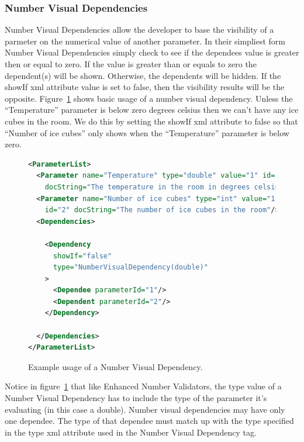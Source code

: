 \subsubsection{Number Visual Dependencies}
Number Visual Dependencies allow the developer to base the visibility of a parmeter on the numerical value of another parameter. In their simpliest form
Number Visual Dependencies simply check to see if the dependees value is greater then or equal to zero. If the value is greater than or equals to zero the
dependent(s) will be shown. Otherwise, the dependents will be hidden. If the showIf xml attribute value is set to false, then the visibility results will
be the opposite. Figure~\ref{NumberVisXML1} shows basic usage of a number visual dependency. Unless the ``Temperature'' parameter is below zero degrees
celsius then we can't have any ice cubes in the room. We do this by setting the showIf xml attribute to false so that ``Number of ice cubes'' only shows
when the ``Temperature'' parameter is below zero.
\begin{figure}
\centering
\begin{lstlisting}[language=XML]
<ParameterList>
  <Parameter name="Temperature" type="double" value="1" id="1" 
    docString="The temperature in the room in degrees celsius"/>
  <Parameter name="Number of ice cubes" type="int" value="1"
    id="2" docString="The number of ice cubes in the room"/>
  <Dependencies>

    <Dependency 
      showIf="false" 
      type="NumberVisualDependency(double)"
    >
      <Dependee parameterId="1"/>
      <Dependent parameterId="2"/>
    </Dependency>

  </Dependencies>
</ParameterList>
  \end{lstlisting}
  \caption{Example usage of a Number Visual Dependency.}
  \label{NumberVisXML1}
\end{figure}
Notice in figure~\ref{NumberVisXML1} that like Enhanced Number Validators, the type value of a Number Visual Dependency has to include the type of the
parameter it's evaluating (in this case a double). Number visual dependencies may have only one dependee. The type of that dependee must match up with the
type specified in the type xml attribute used in the Number Visual Dependency tag.

